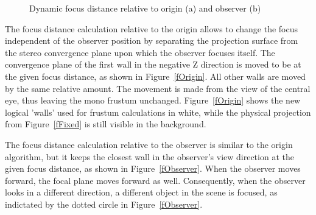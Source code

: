 \documentclass[10pt,a4]{scrartcl}
\newcommand{\fig}[1]{Figure~\ref{#1}}
\begin{document}
\begin{figure}[h!t]\center
  \hfil
  {\caption{\label{fImmersive}Dynamic focus distance relative to origin
      (a) and observer (b)}}
\end{figure}

The focus distance calculation relative to the origin allows to change the
focus independent of the observer position by separating the projection surface
from the stereo convergence plane upon which the observer focuses itself. The
convergence plane of the first wall in the negative Z direction is moved to be
at the given focus distance, as shown in \fig{fOrigin}. All other walls are
moved by the same relative amount. The movement is made from the view of the
central eye, thus leaving the mono frustum unchanged. \fig{fOrigin} shows the
new logical 'walls' used for frustum calculations in white, while the physical
projection from \fig{fFixed} is still visible in the background.

The focus distance calculation relative to the observer is similar to the origin
algorithm, but it keeps the closest wall in the observer's view direction at the
given focus distance, as shown in \fig{fObserver}. When the observer moves
forward, the focal plane moves forward as well. Consequently, when the observer
looks in a different direction, a different object in the scene is focused, as
indictated by the dotted circle in \fig{fObserver}.
\end{document}
